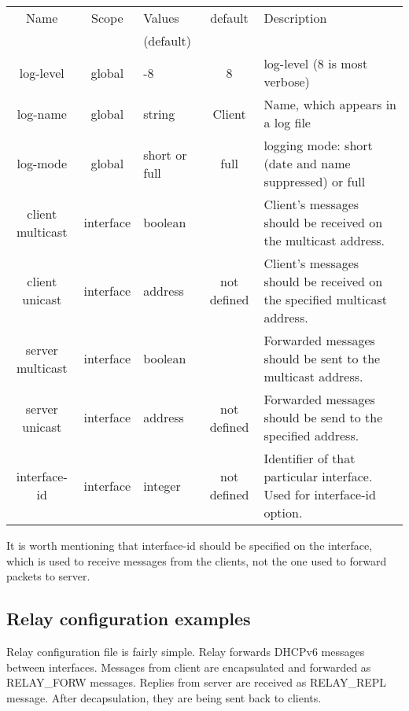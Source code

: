 \begin{tabular}{|c|c|>{\centering}p{1.7cm}<{}|c|p{6cm}|}
\hline
Name             & Scope   & Values      & default    & Description \\
                 &         & (default)   &  & \\
\hline
log-level        & global  & 1-8         & 8          & log-level (8 is most verbose) \\
log-name         & global  & string      & Client     & Name, which appears in a log file\\
log-mode         & global  &short or full& full       & logging mode: short (date and name suppressed) or full \\

client multicast &interface& boolean     &            & Client's messages should be received on the multicast address.\\
client unicast   &interface& address     &not defined & Client's messages should be received on the specified multicast address. \\
server multicast &interface& boolean     &            & Forwarded messages should be sent to the multicast address. \\
server unicast   &interface& address     &not defined & Forwarded messages should be send to the specified address. \\
interface-id     &interface& integer     &not defined & Identifier of that particular interface. Used for interface-id option. \\
\hline
\end{tabular}

\vspace{0.5cm}

It is worth mentioning that interface-id should be specified on the
interface, which is used to receive messages from the clients, not the
one used to forward packets to server.

\subsection{Relay configuration examples}

Relay configuration file is fairly simple. Relay forwards DHCPv6
messages between interfaces. Messages from client are encapsulated and
forwarded as RELAY\_FORW messages. Replies from server are received as
RELAY\_REPL message. After decapsulation, they are being sent back to
clients. 

